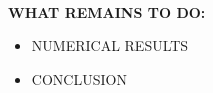 \documentclass[letter,11pt]{article}
\begin{document}
\vfill 

\tableofcontents

~\vfill

\textbf{WHAT REMAINS TO DO:}
\begin{itemize}
\item NUMERICAL RESULTS
\item CONCLUSION
\end{itemize}

%










%


\vfill



\end{document}

